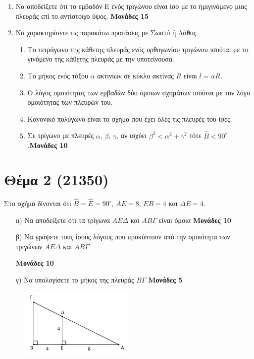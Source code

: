 \documentclass[12pt]{extarticle}
\begin{document}
\begin{enumerate}
    \item Να αποδείξετε ότι το εμβαδόν Ε ενός τριγώνου είναι ίσο με το ημιγινόμενο μιας πλευράς επί το αντίστοιχο ύψος. \hspace*{\fill} \textbf{Μονάδες 15}

    \item Να χαρακτηρίσετε τις παρακάτω προτάσεις με Σωστό ή Λάθος
          \begin{enumerate}
              \item Το τετράγωνο της κάθετης πλευράς ενός ορθογωνίου τριγώνου ισούται με το γινόμενο της κάθετης πλευράς με την υποτείνουσα.
              \item Το μήκος ενός τόξου $α$ ακτινίων σε κύκλο ακτίνας $R$ είναι $l=αR$.
              \item Ο λόγος ομοιότητας των εμβαδών δύο όμοιων σχημάτων ισούται με τον λόγο ομοιότητας των πλευρών του.
              \item Κανονικό πολύγωνο είναι το σχήμα που έχει όλες τις πλευρές του ίσες.
              \item Σε τρίγωνο με πλευρές $α$, $β$, $γ$, αν ισχύει $β^2<α^2+γ^2$ τότε $\hat{Β}<90^{\circ}$.\hspace*{\fill}\textbf{Μονάδες 10}
          \end{enumerate}
\end{enumerate}

\section*{Θέμα 2 (21350)}
\noindent
Στο σχήμα δίνονται ότι $\hat{Β}=\hat{Ε}=90^{\circ}$, $ΑΕ=8$, $ΕΒ=4$ και $ΔΕ=4$.
\begin{enumerate}
    \item[α)] Να αποδείξετε ότι τα τρίγωνα $ΑΕΔ$ και $ΑΒΓ$ είναι όμοια \hspace*{\fill} \textbf{Μονάδες 10}
    \item[β)] Να γράψετε τους ίσους λόγους που προκύπτουν από την ομοιότητα των τριγώνων $ΑΕΔ$ και $ΑΒΓ$

        \hspace*{\fill} \textbf{Μονάδες 10}
    \item[γ)] Να υπολογίσετε το μήκος της πλευράς $ΒΓ$ \hspace*{\fill} \textbf{Μονάδες 5}
\end{enumerate}
\begin{figure}[h]

    \centering
    \includegraphics[width=0.50\textwidth]{2023(2)}
\end{figure}
\end{document}
